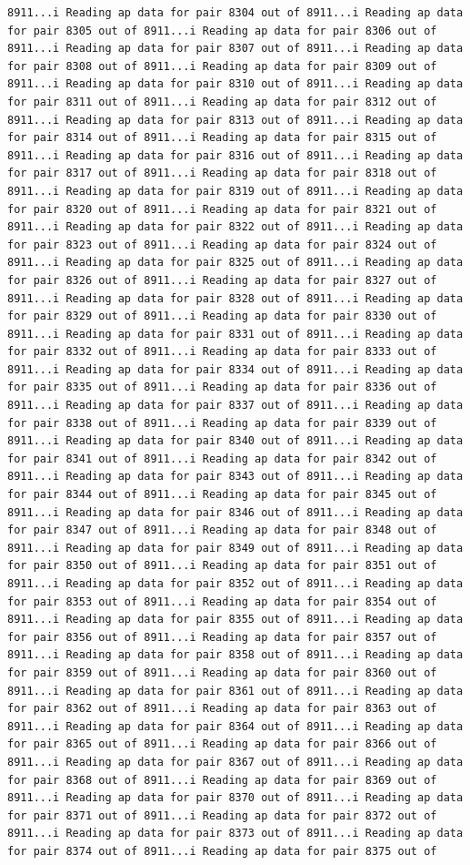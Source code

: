 \documentclass[
]{article}
\begin{document}
\begin{verbatim}
8911...i Reading ap data for pair 8304 out of 8911...i Reading ap data for pair 8305 out of 8911...i Reading ap data for pair 8306 out of 8911...i Reading ap data for pair 8307 out of 8911...i Reading ap data for pair 8308 out of 8911...i Reading ap data for pair 8309 out of 8911...i Reading ap data for pair 8310 out of 8911...i Reading ap data for pair 8311 out of 8911...i Reading ap data for pair 8312 out of 8911...i Reading ap data for pair 8313 out of 8911...i Reading ap data for pair 8314 out of 8911...i Reading ap data for pair 8315 out of 8911...i Reading ap data for pair 8316 out of 8911...i Reading ap data for pair 8317 out of 8911...i Reading ap data for pair 8318 out of 8911...i Reading ap data for pair 8319 out of 8911...i Reading ap data for pair 8320 out of 8911...i Reading ap data for pair 8321 out of 8911...i Reading ap data for pair 8322 out of 8911...i Reading ap data for pair 8323 out of 8911...i Reading ap data for pair 8324 out of 8911...i Reading ap data for pair 8325 out of 8911...i Reading ap data for pair 8326 out of 8911...i Reading ap data for pair 8327 out of 8911...i Reading ap data for pair 8328 out of 8911...i Reading ap data for pair 8329 out of 8911...i Reading ap data for pair 8330 out of 8911...i Reading ap data for pair 8331 out of 8911...i Reading ap data for pair 8332 out of 8911...i Reading ap data for pair 8333 out of 8911...i Reading ap data for pair 8334 out of 8911...i Reading ap data for pair 8335 out of 8911...i Reading ap data for pair 8336 out of 8911...i Reading ap data for pair 8337 out of 8911...i Reading ap data for pair 8338 out of 8911...i Reading ap data for pair 8339 out of 8911...i Reading ap data for pair 8340 out of 8911...i Reading ap data for pair 8341 out of 8911...i Reading ap data for pair 8342 out of 8911...i Reading ap data for pair 8343 out of 8911...i Reading ap data for pair 8344 out of 8911...i Reading ap data for pair 8345 out of 8911...i Reading ap data for pair 8346 out of 8911...i Reading ap data for pair 8347 out of 8911...i Reading ap data for pair 8348 out of 8911...i Reading ap data for pair 8349 out of 8911...i Reading ap data for pair 8350 out of 8911...i Reading ap data for pair 8351 out of 8911...i Reading ap data for pair 8352 out of 8911...i Reading ap data for pair 8353 out of 8911...i Reading ap data for pair 8354 out of 8911...i Reading ap data for pair 8355 out of 8911...i Reading ap data for pair 8356 out of 8911...i Reading ap data for pair 8357 out of 8911...i Reading ap data for pair 8358 out of 8911...i Reading ap data for pair 8359 out of 8911...i Reading ap data for pair 8360 out of 8911...i Reading ap data for pair 8361 out of 8911...i Reading ap data for pair 8362 out of 8911...i Reading ap data for pair 8363 out of 8911...i Reading ap data for pair 8364 out of 8911...i Reading ap data for pair 8365 out of 8911...i Reading ap data for pair 8366 out of 8911...i Reading ap data for pair 8367 out of 8911...i Reading ap data for pair 8368 out of 8911...i Reading ap data for pair 8369 out of 8911...i Reading ap data for pair 8370 out of 8911...i Reading ap data for pair 8371 out of 8911...i Reading ap data for pair 8372 out of 8911...i Reading ap data for pair 8373 out of 8911...i Reading ap data for pair 8374 out of 8911...i Reading ap data for pair 8375 out of 
\end{verbatim}
\end{document}
